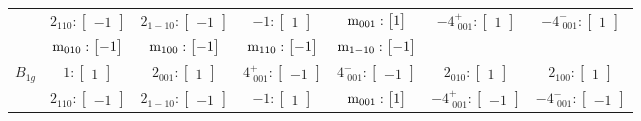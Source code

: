 \documentclass[fleqn,8pt,landscape]{jsarticle}
\begin{document}
\begin{longtable}{ccccccc}
& $ 2{}_{110}:\begin{bmatrix} -1 \end{bmatrix} $ & $ 2{}_{1-10}:\begin{bmatrix} -1 \end{bmatrix} $ & $ -1:\begin{bmatrix} 1 \end{bmatrix} $ & $ {\rm m}_{001}:\begin{bmatrix} 1 \end{bmatrix} $ & $ -4^{+}_{\,\,001}:\begin{bmatrix} 1 \end{bmatrix} $ & $ -4^{-}_{\,\,001}:\begin{bmatrix} 1 \end{bmatrix} $ \\
& $ {\rm m}_{010}:\begin{bmatrix} -1 \end{bmatrix} $ & $ {\rm m}_{100}:\begin{bmatrix} -1 \end{bmatrix} $ & $ {\rm m}_{110}:\begin{bmatrix} -1 \end{bmatrix} $ & $ {\rm m}_{1-10}:\begin{bmatrix} -1 \end{bmatrix} $ & $  $ & $  $ \\ \hline
$ B_{1g} $ & $ 1:\begin{bmatrix} 1 \end{bmatrix} $ & $ 2{}_{001}:\begin{bmatrix} 1 \end{bmatrix} $ & $ 4^{+}_{\,\,001}:\begin{bmatrix} -1 \end{bmatrix} $ & $ 4^{-}_{\,\,001}:\begin{bmatrix} -1 \end{bmatrix} $ & $ 2{}_{010}:\begin{bmatrix} 1 \end{bmatrix} $ & $ 2{}_{100}:\begin{bmatrix} 1 \end{bmatrix} $ \\
& $ 2{}_{110}:\begin{bmatrix} -1 \end{bmatrix} $ & $ 2{}_{1-10}:\begin{bmatrix} -1 \end{bmatrix} $ & $ -1:\begin{bmatrix} 1 \end{bmatrix} $ & $ {\rm m}_{001}:\begin{bmatrix} 1 \end{bmatrix} $ & $ -4^{+}_{\,\,001}:\begin{bmatrix} -1 \end{bmatrix} $ & $ -4^{-}_{\,\,001}:\begin{bmatrix} -1 \end{bmatrix} $ \\

\end{longtable}
\end{document}
